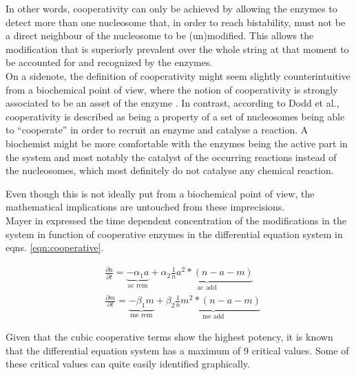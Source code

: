             In other words, cooperativity can only be achieved by allowing the enzymes to detect more than one nucleosome that, in order to reach bistability, must not be a direct neighbour of the nucleosome to be (un)modified. This allows the modification that is superiorly prevalent over the whole string at that moment to be accounted for and recognized by the enzymes.\\

            On a sidenote, the definition of cooperativity might seem slightly counterintuitive from a biochemical point of view, where the notion of cooperativity is strongly associated to be an asset of the enzyme \cite{cooperativityDefBritannica}. In contrast, according to Dodd et al., cooperativity is described as being a property of a set of nucleosomes being able to “cooperate” in order to recruit an enzyme and catalyse a reaction. A biochemist might be more comfortable with the enzymes being the active part in the system and most notably the catalyst of the occurring reactions instead of the nucleosomes, which most definitely do not catalyse any chemical reaction.

            Even though this is not ideally put from a biochemical point of view, the mathematical implications are untouched from these imprecisions.\\

            Mayer in \cite{mayer2020langevin} expressed the time dependent concentration of the modifications in the system in function of cooperative enzymes in the differential equation system in eqns. \ref{eqn:cooperative}.

            \begin{subequations}
                \begin{align}
                    &\frac{\partial a}{\partial t} = \underbrace{- \alpha_1 a }_{\textrm{ac rem}} + \underbrace{ \alpha_2 \frac{1}{n} a^2*(n-a-m) }_{\textrm{ac add}}\\
                    &\frac{\partial m}{\partial t} = \underbrace{- \beta_1 m }_{\textrm{me rem}} + \underbrace{ \beta_2 \frac{1}{n} m^2*(n-a-m) }_{\textrm{me add}}
                \end{align}
                \label{eqn:cooperative}
            \end{subequations}

            Given that the cubic cooperative terms show the highest potency, it is known that the differential equation system has a maximum of 9 critical values. Some of these critical values can quite easily identified graphically.

